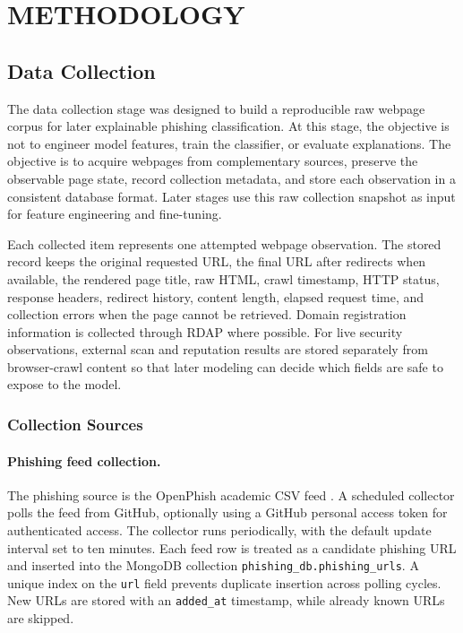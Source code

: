 \documentclass[12pt,letterpaper]{article}
\begin{document}
\section{METHODOLOGY}
\subsection{Data Collection}
The data collection stage was designed to build a reproducible raw webpage corpus for later explainable phishing classification. At this stage, the objective is not to engineer model features, train the classifier, or evaluate explanations. The objective is to acquire webpages from complementary sources, preserve the observable page state, record collection metadata, and store each observation in a consistent database format. Later stages use this raw collection snapshot as input for feature engineering and fine-tuning.

Each collected item represents one attempted webpage observation. The stored record keeps the original requested URL, the final URL after redirects when available, the rendered page title, raw HTML, crawl timestamp, HTTP status, response headers, redirect history, content length, elapsed request time, and collection errors when the page cannot be retrieved. Domain registration information is collected through RDAP where possible. For live security observations, external scan and reputation results are stored separately from browser-crawl content so that later modeling can decide which fields are safe to expose to the model.

\subsubsection{Collection Sources}
\paragraph{Phishing feed collection.}
The phishing source is the OpenPhish academic CSV feed \cite{openphishacademic}. A scheduled collector polls the feed from GitHub, optionally using a GitHub personal access token for authenticated access. The collector runs periodically, with the default update interval set to ten minutes. Each feed row is treated as a candidate phishing URL and inserted into the MongoDB collection \texttt{phishing\_db.phishing\_urls}. A unique index on the \texttt{url} field prevents duplicate insertion across polling cycles. New URLs are stored with an \texttt{added\_at} timestamp, while already known URLs are skipped.
\end{document}
